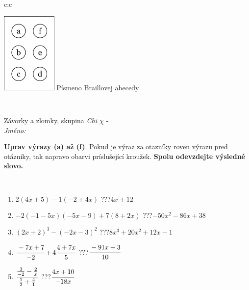 \documentclass[10pt]{report}
\begin{document}
\begin{tabular}{c:c}
\begin{minipage}[c][104.5mm][t]{0.5\linewidth}
\begin{center}
\begin{minipage}{0.20\linewidth}
\begin{center}
\includegraphics[height=40mm]{../images/braille.png}
{\small Písmeno Braillovej abecedy}
\end{center}
\end{minipage}
\end{center}
\end{minipage}
\\ \hdashline
\begin{minipage}[c][104.5mm][t]{0.5\linewidth}
\begin{center}
\vspace{7mm}
{\huge Závorky a zlomky, skupina \textit{Chi $\chi$} -}\\[5mm]
\textit{Jméno:}\phantom{xxxxxxxxxxxxxxxxxxxxxxxxxxxxxxxxxxxxxxxxxxxxxxxxxxxxxxxxxxxxxxxxx}\\[5mm]
\begin{minipage}{0.95\linewidth}
\begin{center}
\textbf{Uprav výrazy (a) až (f)}. Pokud je výraz za otazníky roven výrazu pred otázniky, tak napravo obarvi príslušející kroužek. \textbf{Spolu odevzdejte výsledné slovo.}
\end{center}
\end{minipage}
\\[1mm]
\begin{minipage}{0.79\linewidth}
\begin{center}
\begin{varwidth}{\linewidth}
\begin{enumerate}
\normalsize
\item $2(4x+5)-1(-2+4x)$\quad \dotfill\; ???\;\dotfill \quad $4x+12$
\item $-2(-1-5x)(-5x-9)+7(8+2x)$\quad \dotfill\; ???\;\dotfill \quad $-50x^2-86x+38$
\item $(2x+2)^3-(-2x-3)^2$\quad \dotfill\; ???\;\dotfill \quad $8x^3+20x^2+12x-1$
\item $\cfrac{-7x+7}{-2}+4\cfrac{4+7x}{5}$\quad \dotfill\; ???\;\dotfill \quad $\cfrac{-91x+3}{10}$
\item $\cfrac{\frac{3}{-2}-\frac{2}{x}}{\frac{1}{2}+\frac{4}{1}}$\quad \dotfill\; ???\;\dotfill \quad $\cfrac{4x+10}{-18x}$

\end{enumerate}
\end{varwidth}
\end{center}
\end{minipage}
\end{center}
\end{minipage}
\end{tabular}
\end{document}

